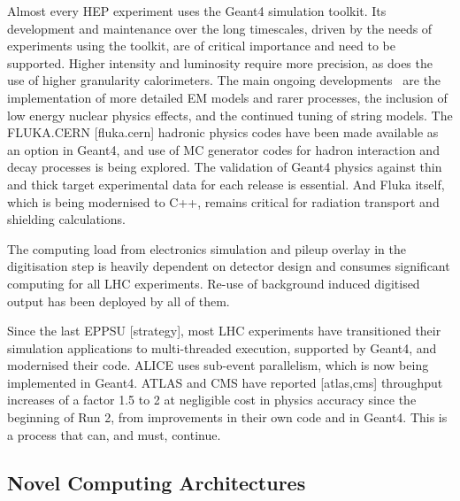 \documentclass[10pt,a4paper]{article}
\begin{document}
Almost every HEP experiment uses the Geant4\cite{geant4} simulation toolkit. Its
development and maintenance over the long timescales, driven by the needs of
experiments using the toolkit, are of critical importance and need to be
supported. Higher intensity and luminosity require more precision, as does the
use of higher granularity calorimeters. The main ongoing
developments~\cite{g4inputs} are the implementation of more detailed EM models
and rarer processes, the inclusion of low energy nuclear physics effects, and
the continued tuning of string models. The FLUKA.CERN {[}fluka.cern{]} hadronic
physics codes have been made available as an option in Geant4, and use of MC
generator codes for hadron interaction and decay processes is being explored.
The validation of Geant4 physics against thin and thick target experimental data
for each release is essential. And Fluka itself, which is being modernised to
C++, remains critical for radiation transport and shielding calculations.

The computing load from electronics simulation and pileup overlay in the
digitisation step is heavily dependent on detector design and consumes
significant computing for all LHC experiments. Re-use of background
induced digitised output has been deployed by all of them.

Since the last EPPSU {[}strategy{]}, most LHC experiments have transitioned
their simulation applications to multi-threaded execution, supported by Geant4,
and modernised their code. ALICE uses sub-event parallelism, which is now being
implemented in Geant4. ATLAS and CMS have reported {[}atlas,cms{]} throughput
increases of a factor 1.5 to 2 at negligible cost in physics accuracy since the
beginning of Run 2, from improvements in their own code and in Geant4. This is a
process that can, and must, continue.

\subsection{Novel Computing
Architectures}\label{novel-computing-architectures}
\end{document}
